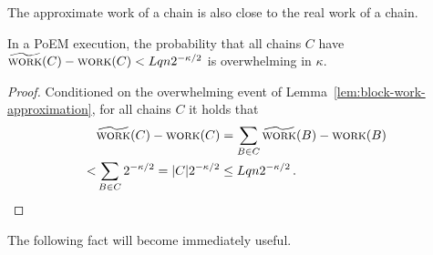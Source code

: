 The approximate work of a chain is also close to the real work of a chain.

\begin{corollary}\label{cor:chain-work-approximation}
  In a PoEM execution, the probability that all chains $C$
  have $\widetilde{\textsc{work}}(C) - \textsc{work}(C) < Lqn 2^{-\kappa/2}$
  is overwhelming in $\kappa$.
\end{corollary}
\begin{proof}
  Conditioned on the overwhelming event of Lemma~\ref{lem:block-work-approximation}, for all
  chains $C$ it holds that
  \begin{align*}
     &\widetilde{\textsc{work}}(C) - \textsc{work}(C) = \sum_{B \in C}{\widetilde{\textsc{work}}(B) - \textsc{work}(B)}\\
    <& \sum_{B \in C}{2^{-\kappa/2}} = |C| 2^{-\kappa/2} \leq Lqn 2^{-\kappa/2}\,.
  \end{align*}
  \Qed
\end{proof}

The following fact will become immediately useful.

